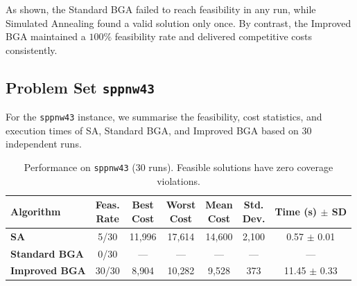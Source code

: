 \documentclass[12pt]{article}
\begin{document}
\noindent
As shown, the Standard BGA failed to reach feasibility in any run, while Simulated Annealing found a valid solution only once. By contrast, the Improved BGA maintained a $100\%$ feasibility rate and delivered competitive costs consistently.

\subsection{Problem Set \texttt{sppnw43}}
\label{subsec:sppnw43}

For the \texttt{sppnw43} instance, we summarise the feasibility, cost statistics, and execution times of SA, Standard BGA, and Improved BGA based on 30 independent runs.

\vspace{1em}

\begin{table}[htbp]
  \centering
  \label{tab:sppnw43}
  \renewcommand{\arraystretch}{1.1}
  \begin{tabular}{lcccccc}
    \hline
    \textbf{Algorithm} 
      & \makecell{Feas.\\Rate} 
      & \makecell{Best\\Cost} 
      & \makecell{Worst\\Cost} 
      & \makecell{Mean\\Cost} 
      & \makecell{Std.\\Dev.} 
      & \makecell{Time\\(s) $\pm$ SD}\\
    \hline
    \textbf{SA}          
      & 5/30
      & 11{,}996
      & 17{,}614
      & 14{,}600
      & 2{,}100
      & 0.57 $\pm$ 0.01 \\
    \textbf{Standard BGA} 
      & 0/30 
      & — 
      & —
      & —
      & —
      & — \\
    \textbf{Improved BGA} 
      & 30/30 
      & 8{,}904
      & 10{,}282
      & 9{,}528
      & 373
      & 11.45 $\pm$ 0.33 \\
    \hline
  \end{tabular}
  \caption{Performance on \texttt{sppnw43} (30 runs). Feasible solutions have zero coverage violations.}
\end{table}
\end{document}
